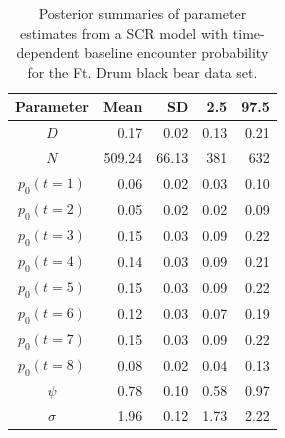 \begin{table}[ht]
\centering
\caption{Posterior summaries of parameter estimates from a SCR model with time-dependent baseline 
encounter probability
 for the Ft. Drum black bear data set.}
\begin{tabular}{crrrr}
\hline \hline
Parameter & Mean & SD & 2.5 & 97.5 \\
\hline
$D$           &    0.17     &  0.02    & 0.13 & 0.21 \\
$N$           &   509.24 &  66.13  & 381  & 632  \\
$p_0 (t=1)$  &    0.06     & 0.02     & 0.03  & 0.10  \\
$p_0 (t=2)$  &    0.05  & 0.02  &      0.02 & 0.09  \\
$p_0 (t=3)$  &    0.15 &  0.03  &     0.09 & 0.22  \\
$p_0 (t=4)$  &    0.14 &  0.03  &     0.09 & 0.21  \\
$p_0 (t=5)$  &    0.15 &  0.03  &    0.09 &  0.22  \\
$p_0 (t=6)$  &    0.12 &  0.03  &    0.07 & 0.19  \\
$p_0 (t=7)$  &    0.15 &  0.03  &    0.09 & 0.22  \\
$p_0 (t=8)$  &    0.08 &  0.02  &    0.04 & 0.13  \\
$\psi$  &   0.78 &  0.10  &  0.58 & 0.97  \\
$\sigma$ & 1.96 &  0.12  &   1.73 & 2.22  \\ \hline
\end{tabular}
\label{covariates.tab.SCRt}
\end{table}

